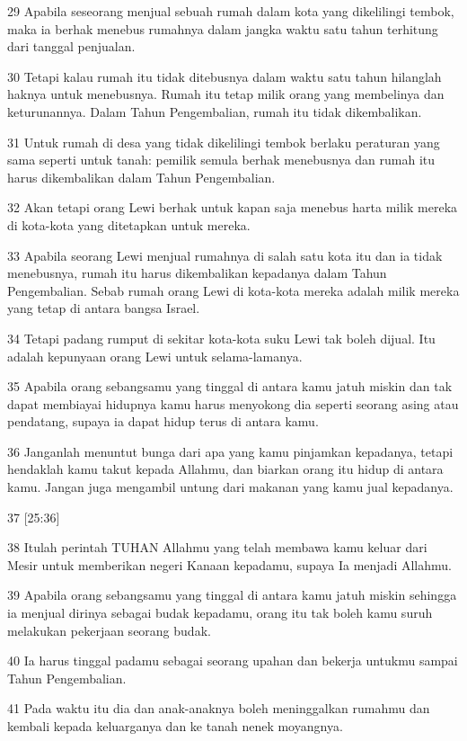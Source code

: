 \par 29 Apabila seseorang menjual sebuah rumah dalam kota yang dikelilingi tembok, maka ia berhak menebus rumahnya dalam jangka waktu satu tahun terhitung dari tanggal penjualan.
\par 30 Tetapi kalau rumah itu tidak ditebusnya dalam waktu satu tahun hilanglah haknya untuk menebusnya. Rumah itu tetap milik orang yang membelinya dan keturunannya. Dalam Tahun Pengembalian, rumah itu tidak dikembalikan.
\par 31 Untuk rumah di desa yang tidak dikelilingi tembok berlaku peraturan yang sama seperti untuk tanah: pemilik semula berhak menebusnya dan rumah itu harus dikembalikan dalam Tahun Pengembalian.
\par 32 Akan tetapi orang Lewi berhak untuk kapan saja menebus harta milik mereka di kota-kota yang ditetapkan untuk mereka.
\par 33 Apabila seorang Lewi menjual rumahnya di salah satu kota itu dan ia tidak menebusnya, rumah itu harus dikembalikan kepadanya dalam Tahun Pengembalian. Sebab rumah orang Lewi di kota-kota mereka adalah milik mereka yang tetap di antara bangsa Israel.
\par 34 Tetapi padang rumput di sekitar kota-kota suku Lewi tak boleh dijual. Itu adalah kepunyaan orang Lewi untuk selama-lamanya.
\par 35 Apabila orang sebangsamu yang tinggal di antara kamu jatuh miskin dan tak dapat membiayai hidupnya kamu harus menyokong dia seperti seorang asing atau pendatang, supaya ia dapat hidup terus di antara kamu.
\par 36 Janganlah menuntut bunga dari apa yang kamu pinjamkan kepadanya, tetapi hendaklah kamu takut kepada Allahmu, dan biarkan orang itu hidup di antara kamu. Jangan juga mengambil untung dari makanan yang kamu jual kepadanya.
\par 37 [25:36]
\par 38 Itulah perintah TUHAN Allahmu yang telah membawa kamu keluar dari Mesir untuk memberikan negeri Kanaan kepadamu, supaya Ia menjadi Allahmu.
\par 39 Apabila orang sebangsamu yang tinggal di antara kamu jatuh miskin sehingga ia menjual dirinya sebagai budak kepadamu, orang itu tak boleh kamu suruh melakukan pekerjaan seorang budak.
\par 40 Ia harus tinggal padamu sebagai seorang upahan dan bekerja untukmu sampai Tahun Pengembalian.
\par 41 Pada waktu itu dia dan anak-anaknya boleh meninggalkan rumahmu dan kembali kepada keluarganya dan ke tanah nenek moyangnya.
